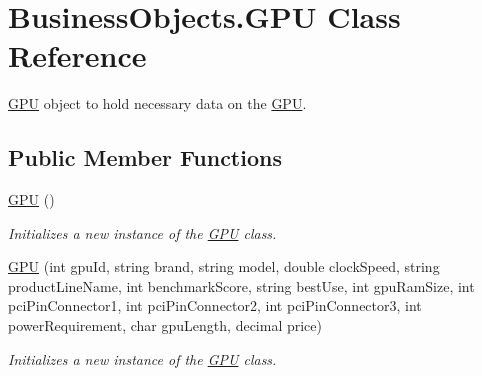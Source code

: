 \hypertarget{class_business_objects_1_1_g_p_u}{}\section{Business\+Objects.\+G\+PU Class Reference}
\label{class_business_objects_1_1_g_p_u}


\hyperlink{class_business_objects_1_1_g_p_u}{G\+PU} object to hold necessary data on the \hyperlink{class_business_objects_1_1_g_p_u}{G\+PU}.  


\subsection*{Public Member Functions}
\begin{DoxyCompactItemize}
\item 
\hyperlink{class_business_objects_1_1_g_p_u_ab773228207f38d564b424c819a4fc9c8}{G\+PU} ()
\begin{DoxyCompactList}\small\item\em Initializes a new instance of the \hyperlink{class_business_objects_1_1_g_p_u}{G\+PU} class. \end{DoxyCompactList}\item 
\hyperlink{class_business_objects_1_1_g_p_u_a444248551f8e905f4e5cbfa1e6f9b90a}{G\+PU} (int gpu\+Id, string brand, string model, double clock\+Speed, string product\+Line\+Name, int benchmark\+Score, string best\+Use, int gpu\+Ram\+Size, int pci\+Pin\+Connector1, int pci\+Pin\+Connector2, int pci\+Pin\+Connector3, int power\+Requirement, char gpu\+Length, decimal price)
\begin{DoxyCompactList}\small\item\em Initializes a new instance of the \hyperlink{class_business_objects_1_1_g_p_u}{G\+PU} class. \end{DoxyCompactList}\end{DoxyCompactItemize}

